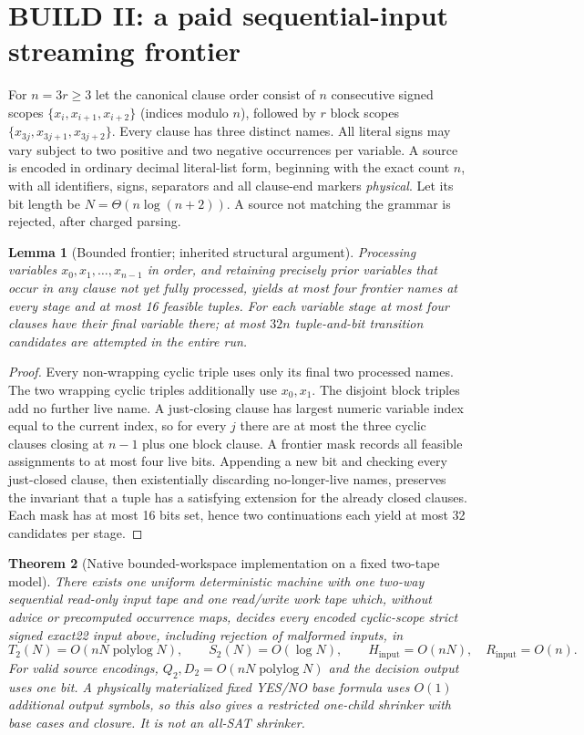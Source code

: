 \documentclass[11pt]{article}
\newtheorem{theorem}{Theorem}
\newtheorem{lemma}[theorem]{Lemma}
\begin{document}
\section{BUILD II: a paid sequential-input streaming frontier}
For $n=3r\ge3$ let the canonical clause order consist of $n$ consecutive signed scopes $\{x_i,x_{i+1},x_{i+2}\}$ (indices modulo $n$), followed by $r$ block scopes $\{x_{3j},x_{3j+1},x_{3j+2}\}$. Every clause has three distinct names. All literal signs may vary subject to two positive and two negative occurrences per variable. A source is encoded in ordinary decimal literal-list form, beginning with the exact count $n$, with all identifiers, signs, separators and all clause-end markers \emph{physical}. Let its bit length be $N=\Theta(n\log(n+2))$. A source not matching the grammar is rejected, after charged parsing.
\begin{lemma}[Bounded frontier; inherited structural argument]
Processing variables $x_0,x_1,\ldots,x_{n-1}$ in order, and retaining precisely prior variables that occur in any clause not yet fully processed, yields at most four frontier names at every stage and at most 16 feasible tuples. For each variable stage at most four clauses have their final variable there; at most $32n$ tuple-and-bit transition candidates are attempted in the entire run.
\end{lemma}
\begin{proof}
Every non-wrapping cyclic triple uses only its final two processed names. The two wrapping cyclic triples additionally use $x_0,x_1$. The disjoint block triples add no further live name. A just-closing clause has largest numeric variable index equal to the current index, so for every $j$ there are at most the three cyclic clauses closing at $n-1$ plus one block clause. A frontier mask records all feasible assignments to at most four live bits. Appending a new bit and checking every just-closed clause, then existentially discarding no-longer-live names, preserves the invariant that a tuple has a satisfying extension for the already closed clauses. Each mask has at most 16 bits set, hence two continuations each yield at most 32 candidates per stage.
\end{proof}
\begin{theorem}[Native bounded-workspace implementation on a fixed two-tape model]
There exists one uniform deterministic machine with one two-way \emph{sequential read-only} input tape and one read/write work tape which, without advice or precomputed occurrence maps, decides every encoded cyclic-scope strict signed exact22 input above, including rejection of malformed inputs, in
\[
 T_2(N)=O(nN\operatorname{polylog}N),\qquad S_2(N)=O(\log N),
 \qquad H_{\mathrm{input}}=O(nN),\quad R_{\mathrm{input}}=O(n).
\]
For valid source encodings, $Q_2,D_2=O(nN\operatorname{polylog}N)$ and the decision output uses one bit. A physically materialized fixed YES/NO base formula uses $O(1)$ additional output symbols, so this also gives a \emph{restricted} one-child shrinker with base cases and closure. It is not an all-SAT shrinker.
\end{theorem}
\end{document}
